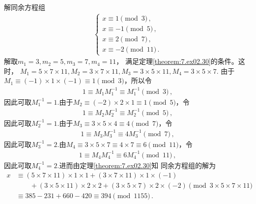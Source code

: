 \begin{example}
    解同余方程组
    \begin{align}
        \left\{
        \begin{array}{l}
            x\equiv1\pmod{3}\, ,  \\
            x\equiv-1\pmod{5}\, , \\
            x\equiv2\pmod{7}\, ,  \\
            x\equiv-2\pmod{11}\, .
        \end{array}
        \right.
    \end{align}
    {\sffamily 解}\quad 取$m_1=3,m_2=5,m_3=7,m_4=11$，
    满足定理\ref{theorem:7.ex02.30}的条件。这时，
    $M_1=5\times7\times11,M_2=3\times7\times11,M_3=3\times5\times11,M_4=3\times5\times7$.
    由于$M_1\equiv(-1)\times1\times(-1)\equiv1\pmod{3}$，所以令
    \begin{align}
        1\equiv M_1M_1^{-1}\equiv M_1^{-1}\pmod{3}\, ,
    \end{align}
    因此可取$M_1^{-1}=1$.由于$M_2\equiv(-2)\times2\times1\equiv1\pmod{5}$，令
    \begin{align}
        1\equiv M_2M_2^{-1}\equiv M_2^{-1}\pmod{5}\, ,
    \end{align}
    因此可取$M_2^{-1}=1$.由于$M_3\equiv3\times5\times4\equiv4\pmod{7}$，令
    \begin{align}
        1\equiv M_3M_3^{-1}\equiv4M_3^{-1}\pmod{7}\, ,
    \end{align}
    因此可取$M_3^{-1}=2$.由$M_4\equiv3\times5\times7\equiv4\times7\equiv6\pmod{11}$，令
    \begin{align}
        1\equiv M_4M_4^{-1}\equiv6M_4^{-1}\pmod{11}\, ,
    \end{align}
    因此可取$M_4^{-1}=2$.进而由定理\ref{theorem:7.ex02.30}知
    同余方程组的解为
    \begin{align}
        x & \equiv(5\times7\times11)\times1\times1+(3\times7\times11)\times1\times(-1)\nonumber                               \\
          & \qquad+(3\times5\times11)\times2\times2+(3\times5\times7)\times2\times(-2)\pmod{3\times5\times7\times11}\nonumber \\
          & \equiv385-231+660-420\equiv394\pmod{1155}\, .
    \end{align}
\end{example}

